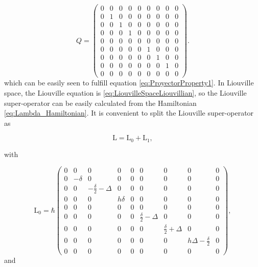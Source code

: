 \documentclass[12pt]{article}
\begin{document}
\begin{equation}
    Q = \begin{pmatrix}
    0&0&0&0&0&0&0&0&0 \\
    0&1&0&0&0&0&0&0&0 \\
    0&0&1&0&0&0&0&0&0 \\
    0&0&0&1&0&0&0&0&0 \\
    0&0&0&0&0&0&0&0&0 \\
    0&0&0&0&0&1&0&0&0 \\
    0&0&0&0&0&0&1&0&0 \\
    0&0&0&0&0&0&0&1&0 \\
    0&0&0&0&0&0&0&0&0 
    \end{pmatrix}.
\end{equation} which can be easily seen to fulfill equation \eqref{eq:ProyectorProperty1}. In Liouville space, the Liouville equation is \eqref{eq:LiouvilleSpaceLiouvillian}, so the Liouville super-operator can be easily calculated from the Hamiltonian \eqref{eq:Lambda_Hamiltonian}. It is convenient to split the Liouville super-operator as

\begin{equation}\label{eq:ThreeLevelAtomLiouvillian}
    \mathrm{L} = \mathrm{L}_0 + \mathrm{L}_1,
\end{equation}

with

\begin{equation} \label{}
   \mathrm{L}_0 = \hbar\begin{pmatrix}0 & 0 & 0 & 0 & 0 & 0 & 0 & 0 & 0\\
0 & - \delta  & 0 & 0 & 0 & 0 & 0 & 0 & 0\\
0 & 0 & -\frac{ \delta }{2}- \Delta  & 0 & 0 & 0 & 0 & 0 & 0\\
0 & 0 & 0 & h \delta  & 0 & 0 & 0 & 0 & 0\\
0 & 0 & 0 & 0 & 0 & 0 & 0 & 0 & 0\\
0 & 0 & 0 & 0 & 0 & \frac{ \delta }{2}- \Delta  & 0 & 0 & 0\\
0 & 0 & 0 & 0 & 0 & 0 & \frac{ \delta }{2}+ \Delta  & 0 & 0\\
0 & 0 & 0 & 0 & 0 & 0 & 0 & h \Delta -\frac{ \delta }{2} & 0\\
0 & 0 & 0 & 0 & 0 & 0 & 0 & 0 & 0\end{pmatrix},
\end{equation} and
\end{document}
